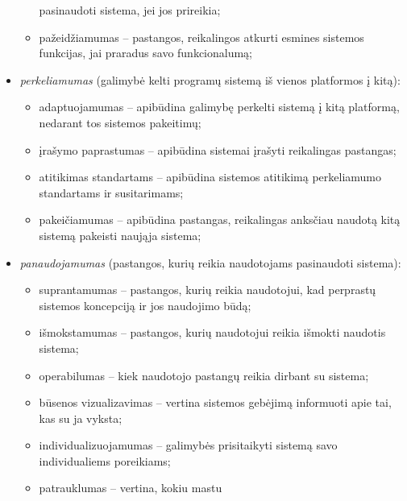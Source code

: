 \begin{itemize}
\begin{itemize}
        pasinaudoti sistema, jei jos prireikia;
      \item pažeidžiamumas  – pastangos, reikalingos
        atkurti esmines sistemos funkcijas, jai praradus savo 
        funkcionalumą;
    \end{itemize}
  \item \emph{perkeliamumas}  (galimybė kelti programų
    sistemą iš vienos platformos į kitą):
    \begin{itemize}
      \item adaptuojamumas  – apibūdina galimybę perkelti
        sistemą į kitą platformą, nedarant tos sistemos pakeitimų;
      \item įrašymo paprastumas  – apibūdina sistemai 
        įrašyti reikalingas pastangas;
      \item atitikimas standartams  – apibūdina sistemos
        atitikimą perkeliamumo standartams ir susitarimams;
      \item pakeičiamumas  – apibūdina pastangas,
        reikalingas anksčiau naudotą kitą sistemą pakeisti naująja sistema;
    \end{itemize}
  \item \emph{panaudojamumas} (pastangos, kurių reikia naudotojams
    pasinaudoti sistema):
    \begin{itemize}
      \item suprantamumas  – pastangos, kurių
        reikia naudotojui, kad perprastų sistemos koncepciją ir jos
        naudojimo būdą;
      \item išmokstamumas  – pastangos, kurių 
        naudotojui reikia išmokti naudotis sistema;
      \item operabilumas  – kiek naudotojo pastangų
        reikia dirbant su sistema;
      \item būsenos vizualizavimas  – vertina sistemos
        gebėjimą informuoti apie tai, kas su ja vyksta;
      \item individualizuojamumas  – galimybės
        prisitaikyti sistemą savo individualiems poreikiams;
      \item patrauklumas  – vertina, kokiu mastu

\end{itemize}
\end{itemize}
